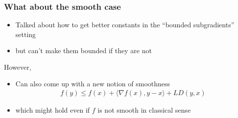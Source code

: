 \documentclass{beamer}
\begin{document}
\begin{frame}
  \frametitle{What about the smooth case}

  \begin{itemize}
    \item Talked about how to get better constants in the ``bounded subgradients'' setting
    \item but can't make them bounded if they are not
  \end{itemize}
  However,
  \begin{itemize}
    \item Can also come up with a new notion of smoothness
          \begin{align}
            f(y) \le f(x) + \langle \nabla f(x), y-x \rangle + L D(y, x)
          \end{align}
    \item which might hold even if $f$ is not smooth in classical sense
  \end{itemize}
\end{frame}
\end{document}
